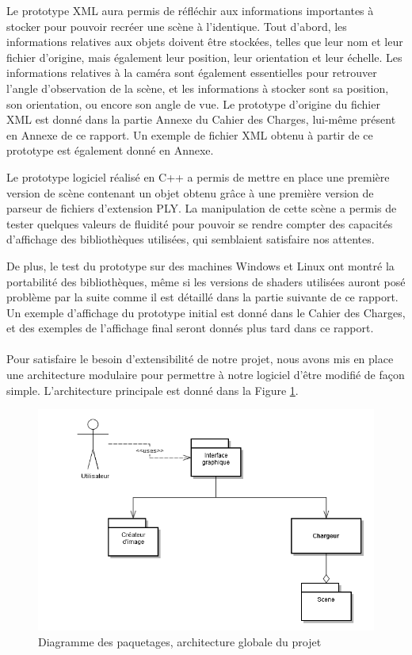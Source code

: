         Le prototype XML aura permis de réfléchir aux informations importantes à stocker pour pouvoir recréer une scène à l'identique. Tout d'abord, les informations relatives aux objets doivent être stockées, telles que leur nom et leur fichier d'origine, mais également leur position, leur orientation et leur échelle. Les informations relatives à la caméra sont également essentielles pour retrouver l'angle d'observation de la scène, et les informations à stocker sont sa position, son orientation, ou encore son angle de vue. Le prototype d'origine du fichier XML est donné dans la partie Annexe du Cahier des Charges, lui-même présent en Annexe de ce rapport. Un exemple de fichier XML obtenu à partir de ce prototype est également donné en Annexe.

        Le prototype logiciel réalisé en C++ a permis de mettre en place une première version de scène contenant un objet obtenu grâce à une première version de parseur de fichiers d'extension PLY. La manipulation de cette scène a permis de tester quelques valeurs de fluidité pour pouvoir se rendre compter des capacités d'affichage des bibliothèques utilisées, qui semblaient satisfaire nos attentes. 
        
        De plus, le test du prototype sur des machines Windows et Linux ont montré la portabilité des bibliothèques, même si les versions de shaders utilisées auront posé problème par la suite comme il est détaillé dans la partie suivante de ce rapport. Un exemple d'affichage du prototype initial est donné dans le Cahier des Charges, et des exemples de l'affichage final seront donnés plus tard dans ce rapport.

\paragraph{}
        Pour satisfaire le besoin d'extensibilité de notre projet, nous avons mis en place une architecture modulaire pour permettre à notre logiciel d'être modifié de façon simple. L'architecture principale est donné dans la Figure \ref{fig:archi_cdc}.

\begin{figure}[h]
	\centering      
	\includegraphics[scale=0.5]{old_pack.png}
	\caption{\label{fig:archi_cdc} Diagramme des paquetages, architecture globale du projet \protect \footnotemark }
\end{figure}

